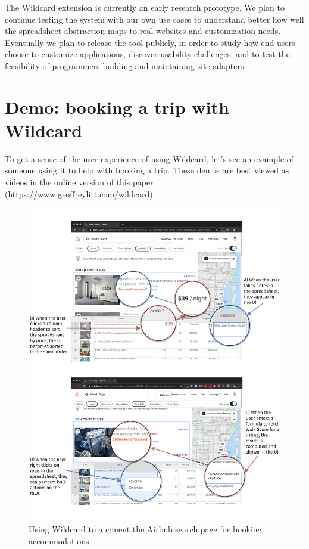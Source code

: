 \documentclass[english,submission]{programming}
\begin{document}
The Wildcard extension is currently an early research prototype. We plan
to continue testing the system with our own use cases to understand
better how well the spreadsheet abstraction maps to real websites and
customization needs. Eventually we plan to release the tool publicly, in
order to study how end users choose to customize applications, discover
usability challenges, and to test the feasibility of programmers
building and maintaining site adapters.

\hypertarget{demo-booking-a-trip-with-wildcard}{%
\section{Demo: booking a trip with
Wildcard}\label{demo-booking-a-trip-with-wildcard}}

To get a sense of the user experience of using Wildcard, let's see an
example of someone using it to help with booking a trip.{ These demos
are best viewed as videos in the online version of this paper
(\url{https://www.geoffreylitt.com/wildcard}).}

\begin{figure}
\hypertarget{fig:airbnb-demo}{%
\centering
\includegraphics{media/airbnb-demo-300dpi.png}
\caption{Using Wildcard to augment the Airbnb search page for booking
accommodations}\label{fig:airbnb-demo}
}
\end{figure}
\end{document}
